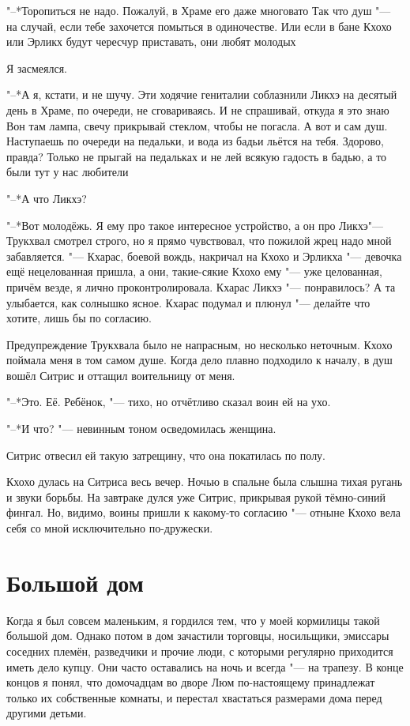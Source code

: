 "--*Торопиться не надо.
Пожалуй, в Храме его даже многовато\ldotst
Так что душ "--- на случай, если тебе захочется помыться в одиночестве.
Или если в бане Кхохо или Эрликх будут чересчур приставать, они любят молодых\ldotst

Я засмеялся.

"--*А я, кстати, и не шучу.
Эти ходячие гениталии соблазнили Ликхэ на десятый день в Храме, по очереди, не сговариваясь.
И не спрашивай, откуда я это знаю\ldotst
Вон там лампа, свечу прикрывай стеклом, чтобы не погасла.
А вот и сам душ.
Наступаешь по очереди на педальки, и вода из бадьи льётся на тебя.
Здорово, правда?
Только не прыгай на педальках и не лей всякую гадость в бадью, а то были тут у нас любители\ldotst

"--*А что Ликхэ?

"--*Вот молодёжь.
Я ему про такое интересное устройство, а он про Ликхэ\ldotst "--- Трукхвал смотрел строго, но я прямо чувствовал, что пожилой жрец надо мной забавляется.
"--- Кхарас, боевой вождь, накричал на Кхохо и Эрликха "--- девочка ещё нецелованная пришла, а они, такие-сякие\ldotst
Кхохо ему "--- уже целованная, причём везде, я лично проконтролировала.
Кхарас Ликхэ "--- понравилось?
А та улыбается, как солнышко ясное.
Кхарас подумал и плюнул "--- делайте что хотите, лишь бы по согласию.

\razd

Предупреждение Трукхвала было не напрасным, но несколько неточным.
Кхохо поймала меня в том самом душе.
Когда дело плавно подходило к началу, в душ вошёл Ситрис и оттащил воительницу от меня.

"--*Это. Её. Ребёнок, "--- тихо, но отчётливо сказал воин ей на ухо.

"--*И что? "--- невинным тоном осведомилась женщина.

Ситрис отвесил ей такую затрещину, что она покатилась по полу.

Кхохо дулась на Ситриса весь вечер.
Ночью в спальне была слышна тихая ругань и звуки борьбы.
На завтраке дулся уже Ситрис, прикрывая рукой тёмно-синий фингал.
Но, видимо, воины пришли к какому-то согласию "--- отныне Кхохо вела себя со мной исключительно по-дружески.

\section{Большой дом}

Когда я был совсем маленьким, я гордился тем, что у моей кормилицы такой большой дом.
Однако потом в дом зачастили торговцы, носильщики, эмиссары соседних племён, разведчики и прочие люди, с которыми регулярно приходится иметь дело купцу.
Они часто оставались на ночь и всегда "--- на трапезу.
В конце концов я понял, что домочадцам во дворе Люм по-настоящему принадлежат только их собственные комнаты, и перестал хвастаться размерами дома перед другими детьми.


